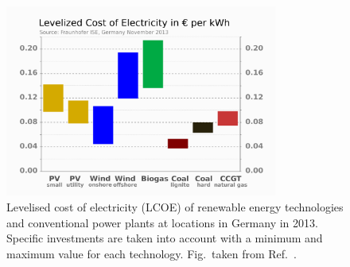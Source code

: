 \documentclass[11pt, twoside]{report}
\begin{document}
\begin{figure}[h!]
  \centering
    \includegraphics[width=0.8\textwidth]{figures/LCOE.png}
    \caption[Levelised cost of electricity (LCOE) of renewable energy technologies and conventional power plants at locations in Germany in 2013.  Specific investments are taken into account with a minimum and maximum value for each technology.]{Levelised cost of electricity (LCOE) of renewable energy technologies and conventional power plants at locations in Germany in 2013.  Specific investments are taken into account with a minimum and maximum value for each technology. Fig.~taken from Ref.~.}
  \label{LCOE}
\end{figure}

\end{document}
